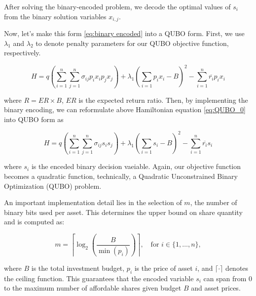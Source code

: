 \documentclass[12pt]{article}
\begin{document}
After solving the binary-encoded problem, we decode the optimal values of $s_i$ from the binary solution variables $x_{i,j}$.

Now, let's make this form \ref{eq:binary encoded} into a QUBO form. First, we use $\lambda_{1}$ and $\lambda_{2}$ to denote penalty parameters for our QUBO objective function, respectively.

\begin{equation}
H = q(\sum_{i=1}^{n}\sum_{j=1}^{n} \sigma_{ij}p_{i}x_{i}p_{j}x_{j}) + \lambda_{1}(\sum_{i=1}p_{i}x_{i} - B)^{2} - \sum_{i=1}^{n}\overline{r_{i}} p_{i}x_{i}
\label{eq:QUBO_0}
\end{equation}

where $R = ER \times B$, $ER$ is the expected return ratio. Then, by implementing the binary encoding, we can reformulate above Hamiltonian equation \ref{eq:QUBO_0} into QUBO form as 

\begin{equation}
H = q(\sum_{i=1}^{n}\sum_{j=1}^{n} \sigma_{ij}s_{i}s_{j}) + \lambda_{1}(\sum_{i=1}s_{i} - B)^{2} - \sum_{i=1}^{n}\overline{r_{i}} s_{i}
\label{eq:QUBO_binary_encoded}
\end{equation}

where $s_i$ is the enceded binary decision vaeiable. Again, our objective function becomes a quadratic function, technically, a Quadratic Unconstrained Binary Optimization (QUBO) problem.

An important implementation detail lies in the selection of $m$, the number of binary bits used per asset. This determines the upper bound on share quantity and is computed as:

\begin{equation}
m = \left\lceil \log_2\left( \frac{B}{\min(p_i)} \right) \right\rceil, \quad \text{for } i \in \{1, \dots, n\},
\label{eq:num_bits}
\end{equation}

where $B$ is the total investment budget, $p_i$ is the price of asset $i$, and $\lceil \cdot \rceil$ denotes the ceiling function. This guarantees that the encoded variable $s_i$ can span from 0 to the maximum number of affordable shares given budget $B$ and asset prices.
\end{document}
